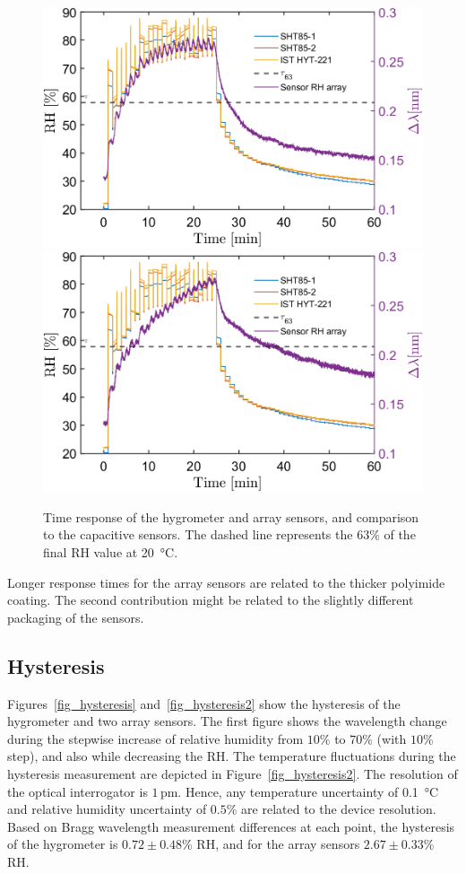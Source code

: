 \begin{figure}[!h]
\centering
\includegraphics[width=0.47\columnwidth]{Chapter5/images/020responseRH.png}
\includegraphics[width=0.47\columnwidth]{Chapter5/images/020responseRH2.png}
\caption{Time response of the hygrometer and array sensors, and comparison to the capacitive sensors. The dashed line represents the $63$\% of the final \gls{RH} value at \SI{20}{\celsius}.}
\label{fig_time_response2}
\end{figure}

Longer response times for the array sensors are related to the thicker polyimide coating. The second contribution might be related to the slightly different packaging of the sensors. 
\subsection{Hysteresis}
Figures~\ref{fig_hysteresis} and~\ref{fig_hysteresis2} show the hysteresis of the hygrometer and two array sensors. The first figure shows the wavelength change during the stepwise increase of relative humidity from $10$\% to $70$\% (with $10$\% step), and also while decreasing the \gls{RH}. The temperature fluctuations during the hysteresis measurement are depicted in Figure~\ref{fig_hysteresis2}. The resolution of the optical interrogator is $1$\,pm. Hence, any temperature uncertainty of \SI{0.1}{\celsius} and relative humidity uncertainty of $0.5$\% are related to the device resolution. Based on Bragg wavelength measurement differences at each point, the hysteresis of the hygrometer is $0.72\pm0.48$\% RH, and for the array sensors $2.67\pm0.33$\% RH. 

